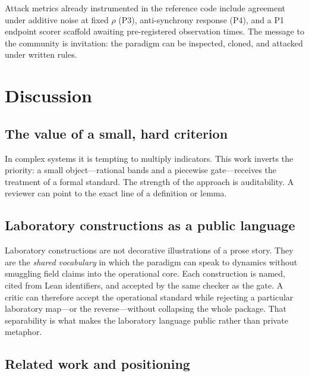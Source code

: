 \documentclass[11pt,a4paper]{article}
\begin{document}
Attack metrics already instrumented in the reference code include agreement under additive noise at fixed \(\rho\) (P3), anti-synchrony response (P4), and a P1 endpoint scorer scaffold awaiting pre-registered observation times. The message to the community is invitation: the paradigm can be inspected, cloned, and attacked under written rules.

\section{Discussion}

\subsection{The value of a small, hard criterion}

In complex systems it is tempting to multiply indicators. This work inverts the priority: a small object---rational bands and a piecewise gate---receives the treatment of a formal standard. The strength of the approach is auditability. A reviewer can point to the exact line of a definition or lemma.

\subsection{Laboratory constructions as a public language}

Laboratory constructions are not decorative illustrations of a prose story. They are the \emph{shared vocabulary} in which the paradigm can speak to dynamics without smuggling field claims into the operational core. Each construction is named, cited from Lean identifiers, and accepted by the same checker as the gate. A critic can therefore accept the operational standard while rejecting a particular laboratory map---or the reverse---without collapsing the whole package. That separability is what makes the laboratory language public rather than private metaphor.

\subsection{Related work and positioning}
\end{document}
